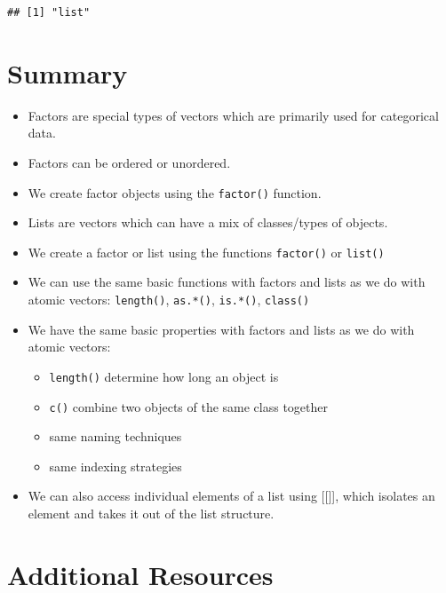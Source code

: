 \documentclass[
]{book}
\begin{document}
\begin{verbatim}
## [1] "list"
\end{verbatim}

\hypertarget{summary-1}{%
\section*{Summary}\label{summary-1}}

\begin{itemize}
\item
  Factors are special types of vectors which are primarily used for categorical data.
\item
  Factors can be ordered or unordered.
\item
  We create factor objects using the \texttt{factor()} function.
\item
  Lists are vectors which can have a mix of classes/types of objects.
\item
  We create a factor or list using the functions \texttt{factor()} or \texttt{list()}
\item
  We can use the same basic functions with factors and lists as we do with atomic vectors: \texttt{length()}, \texttt{as.*()}, \texttt{is.*()}, \texttt{class()}
\item
  We have the same basic properties with factors and lists as we do with atomic vectors:

  \begin{itemize}
  \item
    \texttt{length()} determine how long an object is
  \item
    \texttt{c()} combine two objects of the same class together
  \item
    same naming techniques
  \item
    same indexing strategies
  \end{itemize}
\item
  We can also access individual elements of a list using {[}{[}{]}{]}, which isolates an element and takes it out of the list structure.
\end{itemize}

\hypertarget{additional-resources-2}{%
\section*{Additional Resources}\label{additional-resources-2}}
\end{document}
